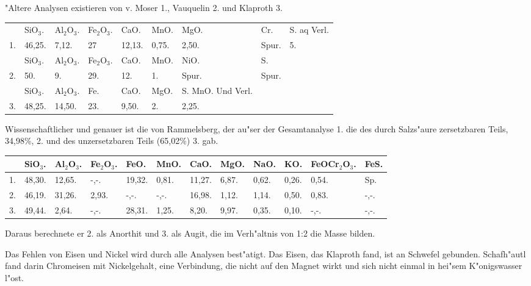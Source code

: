 \documentclass[a4paper, 11pt, oneside]{article}
\begin{document}
"Altere Analysen existieren von v. Moser 1., Vauquelin 2. und Klaproth 3.
\begin{table}[!ht]
    \centering\swabfamily\Large
    \normalsize
    \begin{tabular}{p{3mm} l l l l l p{14mm} l p{13mm}}
         & SiO$_{3}$. & Al$_{2}$O$_{3}$. & Fe$_{2}$O$_{3}$. & CaO. & MnO. & MgO. & Cr. & S. aq Verl. \\
        1. & 46,25. & 7,12. & 27 & 12,13. & 0,75. & 2,50. & Spur. & 5. \\ \hline
         & SiO$_{3}$. & Al$_{2}$O$_{3}$. & Fe$_{2}$O$_{3}$. & CaO. & MnO. & NiO. & S. &  \\
        2. & 50. & 9. & 29. & 12. & 1. & Spur. & Spur. &  \\ \hline
         & SiO$_{3}$. & Al$_{2}$O$_{3}$. & Fe. & CaO. & MgO. & S. MnO. Und Verl. &  &  \\
        3. & 48,25. & 14,50. & 23. & 9,50. & 2. & 2,25. &  &  \\
    \end{tabular}
\end{table}

Wissenschaftlicher und genauer ist die von Rammelsberg, der au"ser der Gesamtanalyse 1. die des durch Salzs"aure zersetzbaren Teils, 34,98\%, 2. und des unzersetzbaren Teils (65,02\%) 3. gab.
\begin{table}[!ht]
    \centering\swabfamily\Large
    \normalsize
    \begin{tabular}{p{2mm} p{5mm} p{6mm} p{6mm} p{6mm} p{6mm} p{6mm} p{5mm} p{5mm} p{5mm} p{12mm} p{5mm}}
         & SiO$_{3}$. & Al$_{2}$O$_{3}$. & Fe$_{2}$O$_{3}$. & FeO. & MnO. & CaO. & MgO. & NaO. & KO. & FeOCr$_{2}$O$_{3}$. & FeS. \\ \hline
        1. & 48,30. & 12,65. & -,-. & 19,32. & 0,81. & 11,27. & 6,87. & 0,62. & 0,26. & 0,54. & Sp. \\
        2. & 46,19. & 31,26. & 2,93. & -,-. & -,-. & 16,98. & 1,12. & 1,14. & 0,50. & 0,83. & -,-. \\
        3. & 49,44. & 2,64. & -,-. & 28,31. & 1,25. & 8,20. & 9,97. & 0,35. & 0,10. & -,-. & -,-. \\
    \end{tabular}
\end{table}

Daraus berechnete er 2. als Anorthit und 3. als Augit, die im Verh"altnis von 1:2 die Masse bilden.

Das Fehlen von Eisen und Nickel wird durch alle Analysen best"atigt. Das Eisen, das Klaproth fand, ist an Schwefel gebunden. Schafh"autl fand darin Chromeisen mit Nickelgehalt, eine Verbindung, die nicht auf den Magnet wirkt und sich nicht einmal in hei"sem K"onigswasser l"ost.
\normalsize
\end{document}
